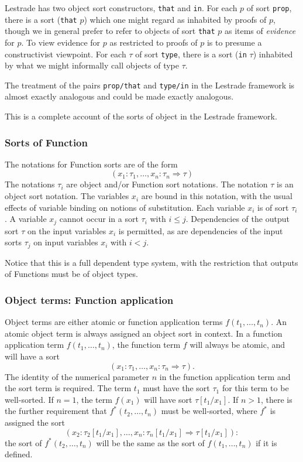 \documentclass[12pt]{article}
\begin{document}
Lestrade has two object sort constructors, {\tt that} and {\tt in}.  For each $p$ of sort {\tt prop}, there is a sort ({\tt that} $p$) which one might regard as inhabited by proofs of $p$, though we in general prefer to refer to objects of sort {\tt that} $p$ as items of {\em evidence\/} for $p$.  To view evidence for $p$ as restricted to proofs of $p$ is to presume a constructivist viewpoint.
For each $\tau$ of sort {\tt type}, there is a sort ({\tt in} $\tau$) inhabited by what we might informally call objects of type $\tau$.

The treatment of the pairs {\tt prop/that} and {\tt type/in} in the Lestrade framework is almost exactly analogous and could be made exactly analogous.

This is a complete account of the sorts of object in the Lestrade framework.

\subsubsection{Sorts of Function}

The notations for Function sorts are of the form $$(x_1:\tau_1,\ldots,x_n:\tau_n\Rightarrow \tau)$$   The notations $\tau_i$ are object and/or Function sort notations.  The notation $\tau$ is an object sort notation.  The variables
$x_i$ are bound in this notation, with the usual effects of variable binding on notions of substitution.   Each variable $x_i$ is of sort $\tau_i$.  A variable $x_j$ cannot occur in a sort $\tau_i$ with $i \leq j$.  Dependencies of the output sort $\tau$ on the input variables $x_i$ is permitted, as are dependencies of the input sorts $\tau_j$ on input variables $x_i$ with $i<j$.

Notice that this is a full dependent type system, with the restriction that outputs of Functions must be of object types.

\subsubsection{Object terms:  Function application}

Object terms are either atomic or function application terms $f(t_1,\ldots,t_n)$.  An atomic object term is always assigned an object sort in context.  In a function application term
$f(t_1,\ldots,t_n)$, the function term $f$ will always be atomic, and will have a sort $$(x_1:\tau_1,\ldots,x_n:\tau_n\Rightarrow \tau).$$  The identity of the numerical parameter $n$ in the function application term and the sort term is required.  The term $t_1$ must have the sort $\tau_1$ for this term to be well-sorted.  If $n=1$, the term $f(x_1)$ will have sort
$\tau[t_1/x_1]$.  If $n>1$, there is the further requirement that $f^*(t_2,\ldots,t_n)$ must be well-sorted, where $f^*$ is assigned the sort 
$$(x_2:\tau_2[t_1/x_1],\ldots,x_n:\tau_n[t_1/x_1]\Rightarrow \tau[t_1/x_1]):$$  the sort of $f^*(t_2,\ldots,t_n)$ will be the same as the sort of $f(t_1,\ldots,t_n)$ if it is defined.
\end{document}
